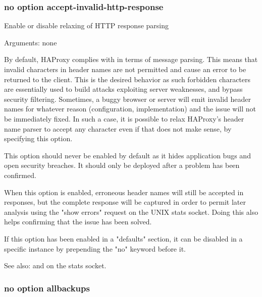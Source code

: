 \subsubsection[accept-invalid-http-response]{}
\subsubsection*{no option accept-invalid-http-response}
  
  Enable or disable relaxing of HTTP response parsing


  Arguments: none

  By default, HAProxy complies with  in terms of message parsing. This
  means that invalid characters in header names are not permitted and cause an
  error to be returned to the client. This is the desired behavior as such
  forbidden characters are essentially used to build attacks exploiting server
  weaknesses, and bypass security filtering. Sometimes, a buggy browser or
  server will emit invalid header names for whatever reason (configuration,
  implementation) and the issue will not be immediately fixed. In such a case,
  it is possible to relax HAProxy's header name parser to accept any character
  even if that does not make sense, by specifying this option.

  This option should never be enabled by default as it hides application bugs
  and open security breaches. It should only be deployed after a problem has
  been confirmed.

  When this option is enabled, erroneous header names will still be accepted in
  responses, but the complete response will be captured in order to permit
  later analysis using the "show errors" request on the UNIX stats socket.
  Doing this also helps confirming that the issue has been solved.

  If this option has been enabled in a "defaults" section, it can be disabled
  in a specific instance by prepending the "no" keyword before it.


See also:  and  on the
             stats socket.

\subsubsection[allbackups]{}
\subsubsection*{no option allbackups}

